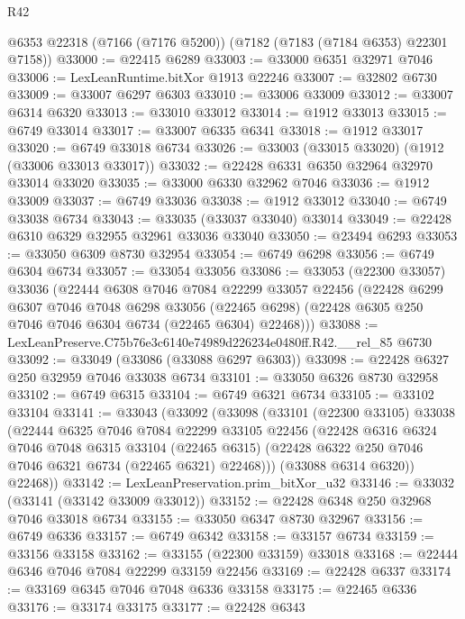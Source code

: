 \begin{lexlean}{R42}
\begin{coremodule}
{    @6353
    @22318
    (@7166 (@7176 @5200))
    (@7182 (@7183 (@7184 @6353) @22301 @7158))
@33000 := @22415 @6289
@33003 := @33000 @6351 @32971 @7046
@33006 := LexLeanRuntime.bitXor @1913 @22246
@33007 := @32802 @6730
@33009 := @33007 @6297 @6303
@33010 := @33006 @33009
@33012 := @33007 @6314 @6320
@33013 := @33010 @33012
@33014 := @1912 @33013
@33015 := @6749 @33014
@33017 := @33007 @6335 @6341
@33018 := @1912 @33017
@33020 := @6749 @33018 @6734
@33026 := @33003 (@33015 @33020) (@1912 (@33006 @33013 @33017))
@33032 := @22428 @6331 @6350 @32964 @32970 @33014 @33020
@33035 := @33000 @6330 @32962 @7046
@33036 := @1912 @33009
@33037 := @6749 @33036
@33038 := @1912 @33012
@33040 := @6749 @33038 @6734
@33043 := @33035 (@33037 @33040) @33014
@33049 := @22428 @6310 @6329 @32955 @32961 @33036 @33040
@33050 := @23494 @6293
@33053 := @33050 @6309 @8730 @32954
@33054 := @6749 @6298
@33056 := @6749 @6304 @6734
@33057 := @33054 @33056
@33086 := @33053
    (@22300 @33057)
    @33036
    (@22444
      @6308
      @7046
      @7084
      @22299
      @33057
      @22456
      (@22428
        @6299
        @6307
        @7046
        @7048
        @6298
        @33056
        (@22465 @6298)
        (@22428 @6305 @250 @7046 @7046 @6304 @6734 (@22465 @6304) @22468)))
@33088 := LexLeanPreserve.C75b76e3c6140e74989d226234e0480ff.R42.__rel_85 @6730
@33092 := @33049 (@33086 (@33088 @6297 @6303))
@33098 := @22428 @6327 @250 @32959 @7046 @33038 @6734
@33101 := @33050 @6326 @8730 @32958
@33102 := @6749 @6315
@33104 := @6749 @6321 @6734
@33105 := @33102 @33104
@33141 := @33043
    (@33092
      (@33098
        (@33101
          (@22300 @33105)
          @33038
          (@22444
            @6325
            @7046
            @7084
            @22299
            @33105
            @22456
            (@22428
              @6316
              @6324
              @7046
              @7048
              @6315
              @33104
              (@22465 @6315)
              (@22428 @6322 @250 @7046 @7046 @6321 @6734 (@22465 @6321) @22468)))
          (@33088 @6314 @6320))
        @22468))
@33142 := LexLeanPreservation.prim_bitXor_u32
@33146 := @33032 (@33141 (@33142 @33009 @33012))
@33152 := @22428 @6348 @250 @32968 @7046 @33018 @6734
@33155 := @33050 @6347 @8730 @32967
@33156 := @6749 @6336
@33157 := @6749 @6342
@33158 := @33157 @6734
@33159 := @33156 @33158
@33162 := @33155 (@22300 @33159) @33018
@33168 := @22444 @6346 @7046 @7084 @22299 @33159 @22456
@33169 := @22428 @6337
@33174 := @33169 @6345 @7046 @7048 @6336 @33158
@33175 := @22465 @6336
@33176 := @33174 @33175
@33177 := @22428 @6343
}
\end{coremodule}
\end{lexlean}
